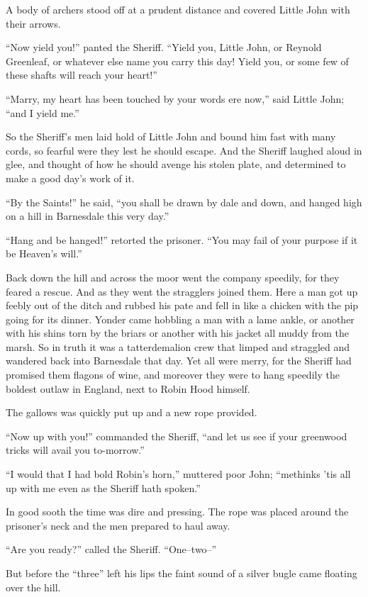 A body of archers stood off at a prudent distance and covered Little
John with their arrows.

``Now yield you!'' panted the Sheriff. ``Yield you, Little John, or
Reynold Greenleaf, or whatever else name you carry this day! Yield you,
or some few of these shafts will reach your heart!''

``Marry, my heart has been touched by your words ere now,'' said Little
John; ``and I yield me.''

So the Sheriff's men laid hold of Little John and bound him fast with
many cords, so fearful were they lest he should escape. And the Sheriff
laughed aloud in glee, and thought of how he should avenge his stolen
plate, and determined to make a good day's work of it.

``By the Saints!'' he said, ``you shall be drawn by dale and down, and
hanged high on a hill in Barnesdale this very day.''

``Hang and be hanged!'' retorted the prisoner. ``You may fail of your
purpose if it be Heaven's will.''

Back down the hill and across the moor went the company speedily, for
they feared a rescue. And as they went the stragglers joined them. Here
a man got up feebly out of the ditch and rubbed his pate and fell in
like a chicken with the pip going for its dinner. Yonder came hobbling a
man with a lame ankle, or another with his shins torn by the briars or
another with his jacket all muddy from the marsh. So in truth it was a
tatterdemalion crew that limped and straggled and wandered back into
Barnesdale that day. Yet all were merry, for the Sheriff had promised
them flagons of wine, and moreover they were to hang speedily the
boldest outlaw in England, next to Robin Hood himself.

The gallows was quickly put up and a new rope provided.

``Now up with you!'' commanded the Sheriff, ``and let us see if your
greenwood tricks will avail you to-morrow.''

``I would that I had bold Robin's horn,'' muttered poor John; ``methinks
'tis all up with me even as the Sheriff hath spoken.''

In good sooth the time was dire and pressing. The rope was placed around
the prisoner's neck and the men prepared to haul away.

``Are you ready?'' called the Sheriff. ``One--two--''

But before the ``three'' left his lips the faint sound of a silver bugle
came floating over the hill.

